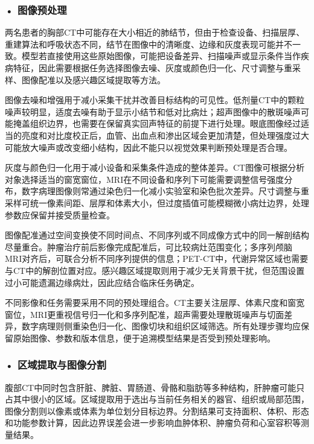 \subsubsection*{\textbf{• 图像预处理}}

两名患者的胸部CT中可能存在大小相近的肺结节，但由于检查设备、扫描层厚、重建算法和呼吸状态不同，结节在图像中的清晰度、边缘和灰度表现可能并不一致。模型若直接使用这些原始图像，可能把设备差异、扫描噪声或显示条件当作疾病特征，因此需要根据任务选择图像去噪、灰度或颜色归一化、尺寸调整与重采样、图像配准以及感兴趣区域提取等方法。

图像去噪和增强用于减小采集干扰并改善目标结构的可见性。低剂量CT中的颗粒噪声较明显，适度去噪有助于显示小结节和低对比病灶；超声图像中的散斑噪声可能掩盖组织边界，也需要在保留真实回声特征的前提下进行处理。眼底图像经过适当的亮度和对比度校正后，血管、出血点和渗出区域会更加清楚，但处理强度过大可能放大噪声或改变细小结构，因此不能只以视觉效果判断预处理是否合理。

灰度与颜色归一化用于减小设备和采集条件造成的整体差异。CT图像可根据分析对象选择适当的窗宽窗位，MRI在不同设备和序列下可能需要调整信号强度分布，数字病理图像则常通过染色归一化减小实验室和染色批次差异。尺寸调整与重采样可统一像素间距、层厚和体素大小，但过度插值可能模糊微小病灶边界，处理参数应保留并接受质量检查。

图像配准通过空间变换使不同时间点、不同序列或不同成像方式中的同一解剖结构尽量重合。肿瘤治疗前后影像完成配准后，可比较病灶范围变化；多序列颅脑MRI对齐后，可联合分析不同序列提供的信息；PET-CT中，代谢异常区域也需要与CT中的解剖位置对应。感兴趣区域提取则用于减少无关背景干扰，但范围设置过小可能遗漏边缘病灶，因此应结合临床任务确定。

不同影像和任务需要采用不同的预处理组合。CT主要关注层厚、体素尺度和窗宽窗位，MRI更重视信号归一化和多序列配准，超声需要处理散斑噪声与切面差异，数字病理则侧重染色归一化、图像切块和组织区域筛选。所有处理步骤均应保留原始图像、参数和版本信息，便于追溯模型结果是否受到预处理影响。

\subsubsection*{\textbf{• 区域提取与图像分割}}

腹部CT中同时包含肝脏、脾脏、胃肠道、骨骼和脂肪等多种结构，肝肿瘤可能只占其中很小的区域。区域提取用于选出与当前任务相关的器官、组织或局部范围，图像分割则以像素或体素为单位划分目标边界。分割结果可支持面积、体积、形态和功能参数计算，因此边界误差会进一步影响血肿体积、肿瘤负荷和心室容积等测量结果。

